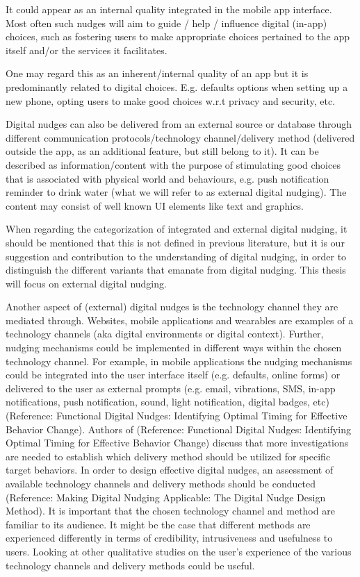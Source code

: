 It could appear as an internal quality integrated in the mobile app interface. Most often such nudges will aim to guide / help / influence digital (in-app) choices, such as fostering users to make appropriate choices pertained to the app itself and/or the services it facilitates. 

One may regard this as an inherent/internal quality of an app but it is predominantly related to digital choices. E.g. defaults options when setting up a new phone, opting users to make good choices w.r.t privacy and security, etc.

Digital nudges can also be delivered from an external source or database through different communication protocols/technology channel/delivery method (delivered outside the app, as an additional feature, but still belong to it). It can be described as information/content with the purpose of stimulating good choices that is associated with physical world and behaviours, e.g. push notification reminder to drink water (what we will refer to as external digital nudging). The content may consist of well known UI elements like text and graphics. 

When regarding the categorization of integrated and external digital nudging, it should be mentioned that this is not defined in previous literature, but it is our suggestion and contribution to the understanding of digital nudging, in order to distinguish the different variants that emanate from digital nudging. This thesis will focus on external digital nudging. 

\bigbreak
\bigbreak
\bigbreak

Another aspect of (external) digital nudges is the technology channel they are mediated through. Websites, mobile applications and wearables are examples of a technology channels (aka digital environments or digital context). Further, nudging mechanisms could be implemented in different ways within the chosen technology channel. For example, in mobile applications the nudging mechanisms could be integrated into the user interface itself (e.g. defaults, online forms) or delivered to the user as external prompts (e.g. email, vibrations, SMS, in-app notifications, push notification, sound, light notification, digital badges, etc) (Reference: Functional Digital Nudges: Identifying Optimal Timing for Effective Behavior Change). Authors of (Reference: Functional Digital Nudges: Identifying Optimal Timing for Effective Behavior Change) discuss that more investigations are needed to establish which delivery method should be utilized for specific target behaviors. 
In order to design effective digital nudges, an assessment of available technology channels and delivery methods should be conducted (Reference: Making Digital Nudging Applicable: The Digital Nudge Design Method). It is important that the chosen technology channel and method are familiar to its audience. It might be the case that different methods are experienced differently in terms of credibility, intrusiveness and usefulness to users. Looking at other qualitative studies on the user's experience of the various technology channels and delivery methods could be useful. 

